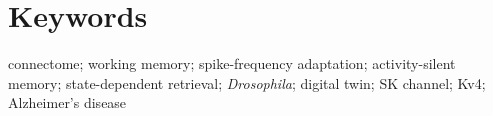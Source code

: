 \section{Keywords}
\noindent connectome; working memory; spike-frequency adaptation; activity-silent memory; state-dependent retrieval;
\textit{Drosophila}; digital twin; SK channel; Kv4; Alzheimer's disease
